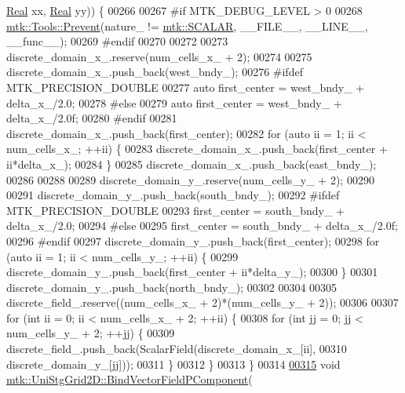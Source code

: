 \begin{DoxyCode}
      \hyperlink{group__c01-roots_gac080bbbf5cbb5502c9f00405f894857d}{Real} xx, \hyperlink{group__c01-roots_gac080bbbf5cbb5502c9f00405f894857d}{Real} yy)) \{
00266 
00267 \textcolor{preprocessor}{  #if MTK\_DEBUG\_LEVEL > 0}
00268   \hyperlink{classmtk_1_1Tools_afe5bb096309258e2e72503fd7b41c7e0}{mtk::Tools::Prevent}(nature\_ != \hyperlink{namespacemtk_ga4c54f2a329cfb4e56213b02a259d19e2af481d45bd70d41381c7d72e200889205}{mtk::SCALAR}, \_\_FILE\_\_, \_\_LINE\_\_, \_\_func\_\_);
00269 \textcolor{preprocessor}{  #endif}
00270 
00272 
00273   discrete\_domain\_x\_.reserve(num\_cells\_x\_ + 2);
00274 
00275   discrete\_domain\_x\_.push\_back(west\_bndy\_);
00276 \textcolor{preprocessor}{  #ifdef MTK\_PRECISION\_DOUBLE}
00277   \textcolor{keyword}{auto} first\_center = west\_bndy\_ + delta\_x\_/2.0;
00278 \textcolor{preprocessor}{  #else}
00279   \textcolor{keyword}{auto} first\_center = west\_bndy\_ + delta\_x\_/2.0f;
00280 \textcolor{preprocessor}{  #endif}
00281   discrete\_domain\_x\_.push\_back(first\_center);
00282   \textcolor{keywordflow}{for} (\textcolor{keyword}{auto} ii = 1; ii < num\_cells\_x\_; ++ii) \{
00283     discrete\_domain\_x\_.push\_back(first\_center + ii*delta\_x\_);
00284   \}
00285   discrete\_domain\_x\_.push\_back(east\_bndy\_);
00286 
00288 
00289   discrete\_domain\_y\_.reserve(num\_cells\_y\_ + 2);
00290 
00291   discrete\_domain\_y\_.push\_back(south\_bndy\_);
00292 \textcolor{preprocessor}{  #ifdef MTK\_PRECISION\_DOUBLE}
00293   first\_center = south\_bndy\_ + delta\_x\_/2.0;
00294 \textcolor{preprocessor}{  #else}
00295   first\_center = south\_bndy\_ + delta\_x\_/2.0f;
00296 \textcolor{preprocessor}{  #endif}
00297   discrete\_domain\_y\_.push\_back(first\_center);
00298   \textcolor{keywordflow}{for} (\textcolor{keyword}{auto} ii = 1; ii < num\_cells\_y\_; ++ii) \{
00299     discrete\_domain\_y\_.push\_back(first\_center + ii*delta\_y\_);
00300   \}
00301   discrete\_domain\_y\_.push\_back(north\_bndy\_);
00302 
00304 
00305   discrete\_field\_.reserve((num\_cells\_x\_ + 2)*(num\_cells\_y\_ + 2));
00306 
00307   \textcolor{keywordflow}{for} (\textcolor{keywordtype}{int} ii = 0; ii < num\_cells\_x\_ + 2; ++ii) \{
00308     \textcolor{keywordflow}{for} (\textcolor{keywordtype}{int} jj = 0; jj < num\_cells\_y\_ + 2; ++jj) \{
00309       discrete\_field\_.push\_back(ScalarField(discrete\_domain\_x\_[ii],
00310                                             discrete\_domain\_y\_[jj]));
00311     \}
00312   \}
00313 \}
00314 
\hypertarget{mtk__uni__stg__grid__2d_8cc_source_l00315}{}\hyperlink{classmtk_1_1UniStgGrid2D_a5ff685fde27134437dd0b372fb6b9958}{00315} \textcolor{keywordtype}{void} \hyperlink{classmtk_1_1UniStgGrid2D_a5ff685fde27134437dd0b372fb6b9958}{mtk::UniStgGrid2D::BindVectorFieldPComponent}(

\end{DoxyCode}

